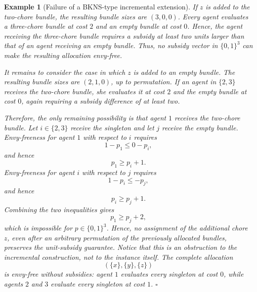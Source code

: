 \documentclass[sigconf,anonymous]{aamas}
\theoremstyle{acmplain}
\theoremstyle{acmdefinition}
\newtheorem{example}[theorem]{Example}
\theoremstyle{acmplain}
\begin{document}
\begin{example}[Failure of a BKNS-type incremental extension]
If $z$ is added to the two-chore bundle, the resulting bundle sizes are $(3,0,0)$. Every agent evaluates a three-chore bundle at cost $2$ and an empty bundle at cost $0$. Hence, the agent receiving the three-chore bundle requires a subsidy at least two units larger than that of an agent receiving an empty bundle. Thus, no subsidy vector in $\{0,1\}^3$ can make the resulting allocation envy-free.

It remains to consider the case in which $z$ is added to an empty bundle. The resulting bundle sizes are $(2,1,0)$, up to permutation. If an agent in $\{2,3\}$ receives the two-chore bundle, she evaluates it at cost $2$ and the empty bundle at cost $0$, again requiring a subsidy difference of at least two.

Therefore, the only remaining possibility is that agent $1$ receives the two-chore bundle. Let $i\in\{2,3\}$ receive the singleton and let $j$ receive the empty bundle. Envy-freeness for agent $1$ with respect to $i$ requires
\[
1-p_1\le 0-p_i,
\]
and hence
\[
p_1\ge p_i+1.
\]
Envy-freeness for agent $i$ with respect to $j$ requires \[
1-p_i\le -p_j,
\] and hence
\[
p_i\ge p_j+1.
\] Combining the two inequalities gives
\[
p_1\ge p_j+2,
\] which is impossible for $p\in\{0,1\}^3$. Hence, no assignment of the additional chore $z$, even after an arbitrary permutation of the previously allocated bundles, preserves the unit-subsidy guarantee. Notice that this is an obstruction to the incremental construction, not to the instance itself. The complete allocation
\[
(\{x\},\{y\},\{z\})
\] is envy-free without subsidies: agent $1$ evaluates every singleton at cost $0$, while agents $2$ and $3$ evaluate every singleton at cost $1$. \hfill $\square$
\end{example}





\end{document}
